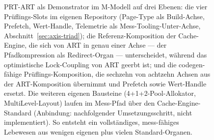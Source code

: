 \begin{nurlang}
\begin{figure}[htbp]
\caption{PRT-ART als Demonstrator im M-Modell auf drei Ebenen: die vier Prüflings-Slots im eigenen Repository (Page-Type als Build-Achse, Prefetch, Wert-Handle, Telemetrie als Mess-Tooling-Unter-Achse, Abschnitt~\ref{sec:axis-triad}); die Referenz-Komposition der Cache-Engine, die sich von ART in genau einer Achse --- der Pfadkompression als Redirect-Organ --- unterscheidet, während das optimistische Lock-Coupling von ART geerbt ist; und die codegen-fähige Prüflings-Komposition, die sechzehn von achtzehn Achsen aus der ART-Komposition übernimmt und Prefetch sowie Wert-Handle ersetzt. Die weiteren eigenen Bausteine (4+1+2-Pool-Allokator, MultiLevel-Layout) laufen im Mess-Pfad über den Cache-Engine-Standard (Anbindung: nachfolgender Umsetzungsschritt, nicht implementiert). So entsteht ein vollständiges, mess-fähiges Lebewesen aus wenigen eigenen plus vielen Standard-Organen.}\label{fig:prtart-demo}
\end{figure}
\end{nurlang}
